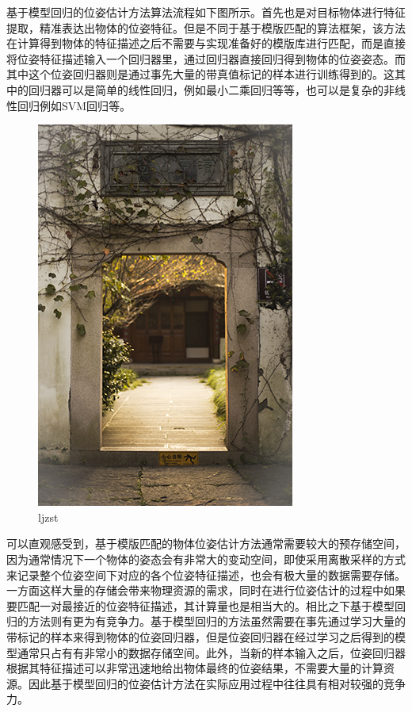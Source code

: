 基于模型回归的位姿估计方法算法流程如下图所示。首先也是对目标物体进行特征提取，精准表达出物体的位姿特征。但是不同于基于模版匹配的算法框架，该方法在计算得到物体的特征描述之后不需要与实现准备好的模版库进行匹配，而是直接将位姿特征描述输入一个回归器里，通过回归器直接回归得到物体的位姿姿态。而其中这个位姿回归器则是通过事先大量的带真值标记的样本进行训练得到的。这其中的回归器可以是简单的线性回归，例如最小二乘回归等等，也可以是复杂的非线性回归例如SVM回归\cite{basak2007support}等。
\begin{figure}[htb]
	\centering 
	\includegraphics[scale=1.0]{./Pictures/test.jpg} 
	\caption{ljzst} 
\end{figure}

可以直观感受到，基于模版匹配的物体位姿估计方法通常需要较大的预存储空间，因为通常情况下一个物体的姿态会有非常大的变动空间，即使采用离散采样的方式来记录整个位姿空间下对应的各个位姿特征描述，也会有极大量的数据需要存储。一方面这样大量的存储会带来物理资源的需求，同时在进行位姿估计的过程中如果要匹配一对最接近的位姿特征描述，其计算量也是相当大的。相比之下基于模型回归的方法则有更为有竞争力。基于模型回归的方法虽然需要在事先通过学习大量的带标记的样本来得到物体的位姿回归器，但是位姿回归器在经过学习之后得到的模型通常只占有有非常小的数据存储空间。此外，当新的样本输入之后，位姿回归器根据其特征描述可以非常迅速地给出物体最终的位姿结果，不需要大量的计算资源。因此基于模型回归的位姿估计方法在实际应用过程中往往具有相对较强的竞争力。


